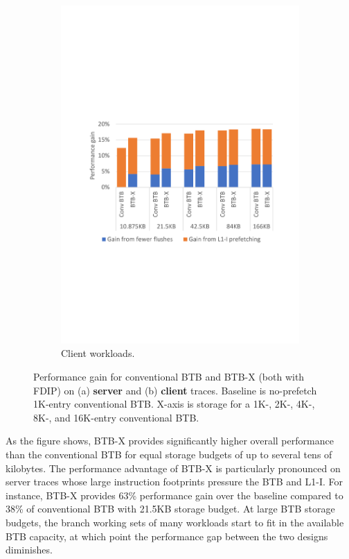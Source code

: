 \begin{figure}
    ~ %
    \begin{subfigure}[t]{0.8\columnwidth}
        \centering
        \includegraphics[width=\columnwidth, trim=70 230 60 230, clip]{figures/clientRes3.pdf}
        \caption{Client workloads.}
        \label{cal:fig:clientPerf}
    \end{subfigure}
    \caption{Performance gain for conventional BTB and BTB-X (both with FDIP) on (a) \textbf{server} and (b) \textbf{client} traces. Baseline is no-prefetch 1K-entry conventional BTB. X-axis is storage for a 1K-, 2K-, 4K-, 8K-, and 16K-entry conventional BTB.}
    \label{cal:fig:perf}
\end{figure}

As the figure shows, BTB-X provides significantly higher overall performance than the conventional BTB for equal storage budgets of up to several tens of kilobytes. The performance advantage of BTB-X is particularly pronounced on server traces whose large instruction footprints pressure the BTB and L1-I. For instance, BTB-X provides 63\% performance gain over the baseline compared to 38\% of conventional BTB with 21.5KB storage budget.
At large BTB storage budgets, the branch working sets of many workloads start to fit in the available BTB capacity, at which point the performance gap between the two designs diminishes.

